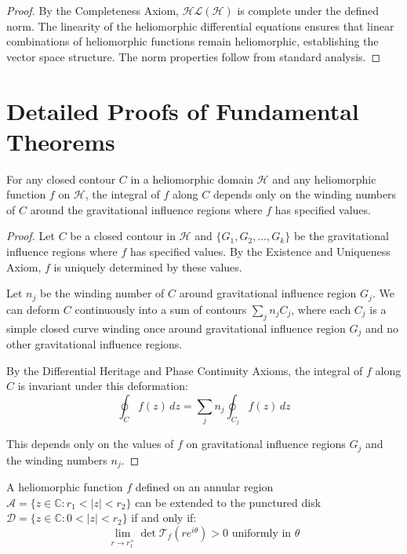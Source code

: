 \begin{proof}
By the Completeness Axiom, $\mathcal{HL}(\mathcal{H})$ is complete under the defined norm. The linearity of the heliomorphic differential equations ensures that linear combinations of heliomorphic functions remain heliomorphic, establishing the vector space structure. The norm properties follow from standard analysis.
\end{proof}

\section{Detailed Proofs of Fundamental Theorems}

\begin{theorem}
For any closed contour $C$ in a heliomorphic domain $\mathcal{H}$ and any heliomorphic function $f$ on $\mathcal{H}$, the integral of $f$ along $C$ depends only on the winding numbers of $C$ around the gravitational influence regions where $f$ has specified values.
\end{theorem}

\begin{proof}
Let $C$ be a closed contour in $\mathcal{H}$ and $\{G_1, G_2, \ldots, G_k\}$ be the gravitational influence regions where $f$ has specified values. By the Existence and Uniqueness Axiom, $f$ is uniquely determined by these values.

Let $n_j$ be the winding number of $C$ around gravitational influence region $G_j$. We can deform $C$ continuously into a sum of contours $\sum_j n_j C_j$, where each $C_j$ is a simple closed curve winding once around gravitational influence region $G_j$ and no other gravitational influence regions.

By the Differential Heritage and Phase Continuity Axioms, the integral of $f$ along $C$ is invariant under this deformation:
\begin{equation}
\oint_C f(z) \, dz = \sum_j n_j \oint_{C_j} f(z) \, dz
\end{equation}

This depends only on the values of $f$ on gravitational influence regions $G_j$ and the winding numbers $n_j$.
\end{proof}

\begin{theorem}
A heliomorphic function $f$ defined on an annular region $\mathcal{A} = \{z \in \mathbb{C} : r_1 < |z| < r_2\}$ can be extended to the punctured disk $\mathcal{D} = \{z \in \mathbb{C} : 0 < |z| < r_2\}$ if and only if:
\begin{equation}
\lim_{r \to r_1^+} \det\mathcal{T}_f(re^{i\theta}) > 0 \text{ uniformly in } \theta
\end{equation}
\end{theorem}

